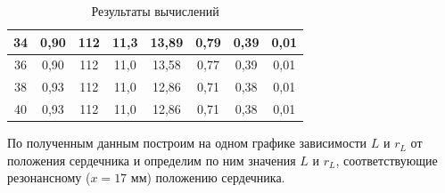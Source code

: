 \documentclass[a4paper,12pt]{article} %
\begin{document}
\begin{table}[H]
\begin{tabular}{|c|c|c|c|c|c|c|c|}
		34        & 0,90     & 112        & 11,3        & 13,89       & 0,79                   & 0,39      & 0,01           \\ \hline
		36        & 0,90     & 112        & 11,0        & 13,58       & 0,77                   & 0,39      & 0,01           \\ \hline
		38        & 0,93     & 112        & 11,0        & 12,86       & 0,71                   & 0,38      & 0,01           \\ \hline
		40        & 0,93     & 112        & 11,0        & 12,86       & 0,71                   & 0,38      & 0,01           \\ \hline
	\end{tabular}
	\caption{Результаты вычислений}
	\label{tab:2}
\end{table}

По полученным данным построим на одном графике зависимости $ L $ и $ r_L $ от положения сердечника и определим по ним значения $ L $ и $ r_L $, соответствующие резонансному ($ x=17 $ мм) положению сердечника.
\end{document}
